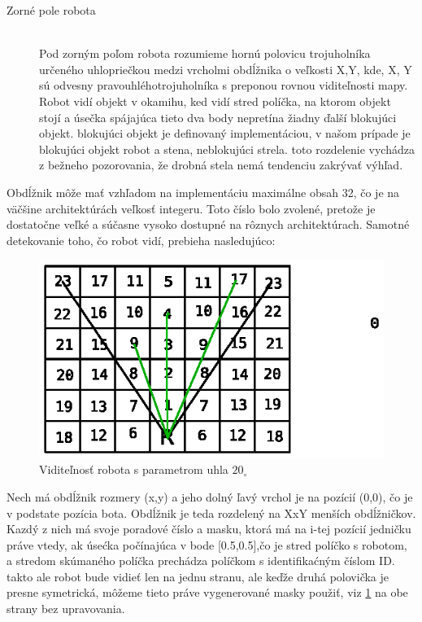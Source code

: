 \begin{description}
\item[Zorné pole robota]\hfill \\
Pod zorným poľom robota rozumieme hornú polovicu trojuholníka určeného uhlopriečkou medzi vrcholmi obdĺžnika o veľkosti X,Y, kde, X, Y sú odvesny pravouhléhotrojuholníka s preponou rovnou viditeľnosti mapy. \\
Robot vidí objekt v okamihu, ked vidí stred políčka, na ktorom objekt stojí a úsečka spájajúca tieto dva body nepretína žiadny ďalší blokujúci objekt. blokujúci objekt je definovaný implementáciou, v našom prípade je blokujúci objekt robot a stena, neblokujúci strela. toto rozdelenie vychádza z bežneho pozorovania, že drobná stela nemá tendenciu zakrývať výhľad.
\end{description}
Obdĺžnik môže mať vzhľadom na implementáciu maximálne obsah 32, čo je na väčšine architektúrách veľkosť integeru. Toto číslo bolo zvolené, pretože je dostatočne veľké a súčasne vysoko dostupné na rôznych architektúrach. Samotné detekovanie toho, čo robot vidí, prebieha nasledujúco: \\
\begin{figure}
\centering
\includegraphics[totalheight=0.4\textheight,width=.8\textwidth]{visibility}
\caption {Viditeľnosť robota s parametrom uhla $20_\circ$}
\label{visibility}
\end{figure}
Nech má obdĺžnik rozmery (x,y) a jeho dolný ľavý vrchol je na pozícií (0,0), čo je v podstate pozícia bota. Obdĺžnik je teda rozdelený na XxY menších obdĺžničkov. Kazdý z nich má svoje poradové číslo a masku, ktorá má na i-tej pozícií jedničku práve vtedy, ak úsećka počínajúca v bode [0.5,0.5],čo je stred políčko s robotom, a stredom skúmaného políčka prechádza políčkom s identifikaćným číslom ID. takto ale robot bude vidieť len na jednu stranu, ale keďže druhá polovička je presne symetrická, môžeme tieto práve vygenerované masky použiť, viz \ref{visibility}  na obe strany bez upravovania. \\
